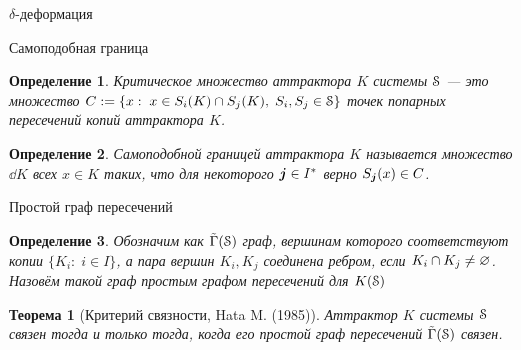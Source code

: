\documentclass[aspectratio=1610, 10pt, notheorems]{beamer}
\newtheorem{theorem}     {Теорема}
\newtheorem{definition}  {Определение}
\begin{document}
\begin{frame}{$\delta$-деформация}

\end{frame}


\begin{frame}{}

\end{frame}


\begin{frame}{}

\end{frame}


\begin{frame}{}

\end{frame}


\begin{frame}{}

\end{frame}


\begin{frame}{}

\end{frame}


\begin{frame}{}

\end{frame}


\begin{frame}{Самоподобная граница}
\begin{definition}
{\em Критическое множество} аттрактора $K$ системы ${\EuScript S}$ --- это множество $C:=\{x:\; x\in S_i(K)\cap S_j(K),\; S_i, S_j\in{\EuScript S}\}$ точек попарных пересечений копий аттрактора $K$.
\end{definition}
\begin{definition}
{\em Самоподобной границей} аттрактора $K$ называется множество $\dd K$ всех $x\in K$ таких, что для некоторого ${\bm{j}}\in I^*$ верно $S_{\bm{j}}(x)\in C$.
\end{definition}
\end{frame}


\begin{frame}{Простой граф пересечений}
\begin{definition}
Обозначим как $\tilde{\Gamma}({\EuScript S})$ граф, вершинам которого соответствуют копии $\{K_i:\; i\in I\}$, а пара вершин $K_i,K_j$ соединена ребром, если $K_i\cap K_j\neq\varnothing$.
Назовём такой граф {\em простым графом пересечений} для $K({\EuScript S})$ 
\end{definition}

\begin{theorem}[Критерий связности, Hata M. (1985)]
Аттрактор $K$ системы ${\EuScript S}$ связен тогда и только тогда, когда его простой граф пересечений $\tilde{\Gamma}({\EuScript S})$ связен.
\end{theorem}
\end{frame}
\end{document}
